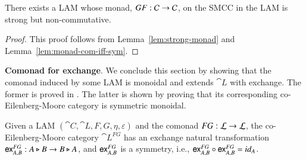 \begin{theorem}
  There exists a LAM whose monad, $GF : \mathcal{C} \rightarrow \mathcal{C}$, on the SMCC
  in the LAM is strong but non-commutative.
\end{theorem}
\begin{proof}
  This proof follows from Lemma~\ref{lem:strong-monad} and
  Lemma~\ref{lem:monad-com-iff-sym}.
\end{proof}

\textbf{Comonad for exchange}.  We conclude this section by showing
that the comonad induced by some LAM is monoidal and extends $\cat{L}$
with exchange. The former is proved in \cite{kelly1974doctrinal}. The
latter is shown by proving that its corresponding co-Eilenberg-Moore
category is symmetric monoidal.

\begin{theorem}
  \label{thm:em-exchange}
  Given a LAM $(\cat{C},\cat{L},F,G,\eta,\varepsilon)$ and the comonad
  $FG : \mathcal{L} \rightarrow \mathcal{L}$, the co-Eilenberg-Moore category
  $\cat{L}^{FG}$ has an exchange natural transformation $\mathsf{ex}_{A,B}^{FG}:A\triangleright
  B\rightarrow B\triangleright A$, and $\mathsf{ex}_{A,B}^{FG}$ is a symmetry, i.e.,
  $\mathsf{ex}_{A,B}^{FG} \circ \mathsf{ex}_{A,B}^{FG} = id_A$.
\end{theorem}
